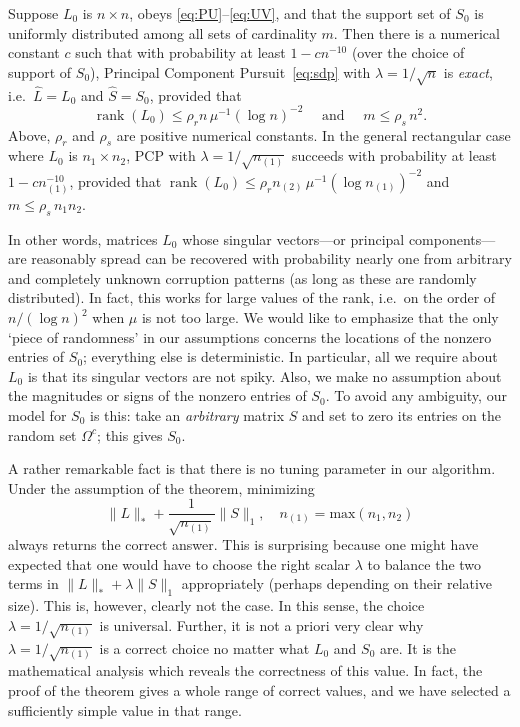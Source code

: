 \begin{theorem}
\label{teo:main}
Suppose $L_0$ is $n \times n$, obeys \eqref{eq:PU}--\eqref{eq:UV}, and that the support set of $S_0$ is uniformly distributed among all sets of cardinality $m$. Then there is a numerical constant $c$ such that with probability at least $1 - c n^{-10}$ (over the choice of support of $S_0$), Principal Component Pursuit\, \eqref{eq:sdp} with $\lambda = 1/\sqrt{n}$ is {\em
  exact}, i.e.~$\hat L = L_0$ and $\hat S = S_0$, provided that
\begin{equation}
\label{eq:main}
\operatorname{rank}(L_0) \le \rho_r  n\, \mu^{-1} (\log n)^{-2} \quad \text{ and } 
\quad m \le \rho_s\, n^2.
\end{equation}
Above, $\rho_r$ and $\rho_s$ are positive numerical constants. In the general rectangular case where $L_0$ is $n_1 \times n_2$, PCP with
$\lambda = 1/\sqrt{n_{(1)}}$ succeeds with probability at least $1 - c n_{(1)}^{-10}$, provided that $\operatorname{rank}(L_0) \le \rho_r n_{(2)} \,
\mu^{-1} (\log n_{(1)})^{-2}$ and $m \le \rho_s\, n_1 n_2$.
\end{theorem}

In other words, matrices $L_0$ whose singular vectors---or principal components---are reasonably spread can be recovered with probability nearly one from arbitrary and completely unknown corruption patterns (as long as these are randomly distributed). In fact, this works for large values of the rank, i.e.~on the order of $n/(\log n)^2$ when
$\mu$ is not too large.  We would like to emphasize that the only `piece of randomness' in our assumptions concerns the locations of the nonzero entries of $S_0$; everything else is deterministic.  In particular, all we require about $L_0$ is that its singular vectors are not spiky. Also, we make no assumption about the magnitudes or signs of the nonzero entries of $S_0$. To avoid any ambiguity, our model for $S_0$ is this: take an {\em arbitrary} matrix $S$ and set to zero its entries on the random set $\Omega^c$; this gives $S_0$.

A rather remarkable fact is that there is no tuning parameter in our algorithm. Under the assumption of the theorem, minimizing
\[
\|L\|_* + \frac{1}{\sqrt{n_{(1)}}} \|S\|_1, \quad n_{(1)} =
\textrm{max}(n_1,n_2)
\]
always returns the correct answer. This is surprising because one might have expected that one would have to choose the right scalar
$\lambda$ to balance the two terms in $\|L\|_* + \lambda \|S\|_1$
appropriately (perhaps depending on their relative size). This is, however, clearly not the case. In this sense, the choice $\lambda =
1/\sqrt{n_{(1)}}$ is universal.  Further, it is not a priori very clear why $\lambda = 1/\sqrt{n_{(1)}}$ is a correct choice no matter what $L_0$ and $S_0$ are. It is the mathematical analysis which reveals the correctness of this value. In fact, the proof of the theorem gives a whole range of correct values, and we have selected a sufficiently simple value in that range.

